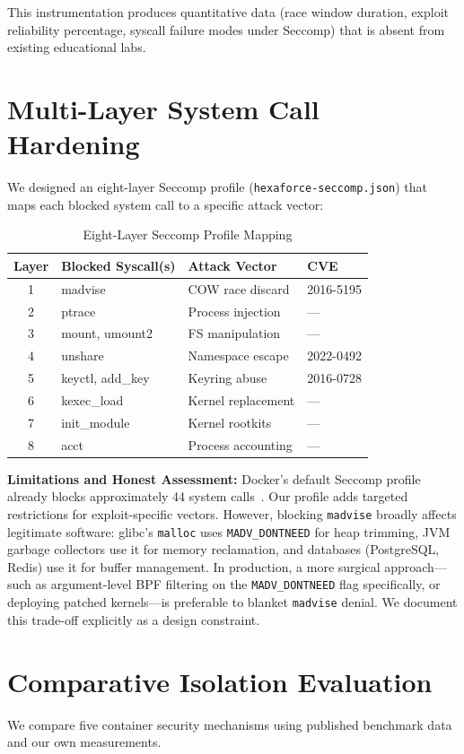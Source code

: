 \documentclass[conference]{IEEEtran}
\begin{document}
This instrumentation produces quantitative data (race window duration, exploit reliability percentage, syscall failure modes under Seccomp) that is absent from existing educational labs.

\section{Multi-Layer System Call Hardening}
We designed an eight-layer Seccomp profile (\texttt{hexaforce-seccomp.json}) that maps each blocked system call to a specific attack vector:

\begin{table}[h]
\centering
\caption{Eight-Layer Seccomp Profile Mapping}
\label{tab:seccomp}
\begin{tabular}{@{}clll@{}}
\toprule
\textbf{Layer} & \textbf{Blocked Syscall(s)} & \textbf{Attack Vector} & \textbf{CVE} \\
\midrule
1 & madvise & COW race discard & 2016-5195 \\
2 & ptrace & Process injection & --- \\
3 & mount, umount2 & FS manipulation & --- \\
4 & unshare & Namespace escape & 2022-0492 \\
5 & keyctl, add\_key & Keyring abuse & 2016-0728 \\
6 & kexec\_load & Kernel replacement & --- \\
7 & init\_module & Kernel rootkits & --- \\
8 & acct & Process accounting & --- \\
\bottomrule
\end{tabular}
\end{table}

\textbf{Limitations and Honest Assessment:}
Docker's default Seccomp profile already blocks approximately 44 system calls~\cite{b3}. Our profile adds targeted restrictions for exploit-specific vectors. However, blocking \texttt{madvise} broadly affects legitimate software: glibc's \texttt{malloc} uses \texttt{MADV\_DONTNEED} for heap trimming, JVM garbage collectors use it for memory reclamation, and databases (PostgreSQL, Redis) use it for buffer management. In production, a more surgical approach---such as argument-level BPF filtering on the \texttt{MADV\_DONTNEED} flag specifically, or deploying patched kernels---is preferable to blanket \texttt{madvise} denial. We document this trade-off explicitly as a design constraint.

\section{Comparative Isolation Evaluation}
We compare five container security mechanisms using published benchmark data~\cite{b13,b14} and our own measurements.
\end{document}
